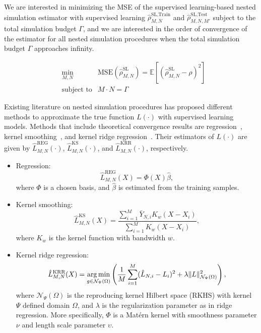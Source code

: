 We are interested in minimizing the MSE of the supervised learning-based nested simulation estimator with supervised learning $\hat{\rho}^{\text{SL}, \text{Train}}_{M, N}$ and $\hat{\rho}^{\text{SL}, \text{Test}}_{M, N, M'}$ subject to the total simulation budget $\Gamma$, and we are interested in the order of convergence of the estimator for all nested simulation procedures when the total simulation budget $\Gamma$ approaches infinity.

\begin{align}
    & \min_{M, N}  & \text{MSE}(\hat{\rho}^{\text{SL}}_{M, N}) = \mathbb{E} \left[ \left( \hat{\rho}^{\text{SL}}_{M, N} - \rho \right)^2 \right] \nonumber \\
    & \text{subject to} & M \cdot N = \Gamma 
\end{align}

Existing literature on nested simulation procedures has proposed different methods to approximate the true function $L(\cdot)$ with supervised learning models. 
Methods that include theoretical convergence results are regression~\citep{broadie2015risk}, kernel smoothing~\citep{hong2017kernel}, and kernel ridge regression~\citep{wang2022smooth}.
Their estimators of $L(\cdot)$ are given by $\hat{L}^{\text{REG}}_{M, N}(\cdot)$, $\hat{L}^{\text{KS}}_{M, N}(\cdot)$, and $\hat{L}^{\text{KRR}}_{M, N}(\cdot)$, respectively.

\begin{itemize}
    \item   Regression:
            $$\hat{L}^{\text{REG}}_{M, N}(X) = \Phi(X) \hat{\beta},$$
            where $\Phi$ is a chosen basis, and $\hat{\beta}$ is estimated from the training samples.
    \item   Kernel smoothing:
            $$\hat{L}^{\text{KS}}_{M, N}(X) = \frac{\sum_{i=1}^M \bar{Y}_{N, i} K_w(X - X_i)}{\sum_{i=1}^M K_w(X - X_i)}, $$
            where $K_w$ is the kernel function with bandwidth $w$.
    \item   Kernel ridge regression:
            $$\hat{L}^{\text{KRR}}_{M, N}(X) = \operatorname*{arg\,min}_{g \in \mathcal{N}_{\Psi}(\Omega)} \left( \frac{1}{M} \sum_{i=1}^M (\hat{L}_{N, i} - L_i)^2 + \lambda \|L\|_{\mathcal{N}_{\Psi}(\Omega)}^2\right),$$
            where $\mathcal{N}_{\Psi}(\Omega)$ is the reproducing kernel Hilbert space (RKHS) with kernel $\Psi$ defined domain $\Omega$, and $\lambda$ is the regularization parameter as in ridge regression. 
            More specifically, $\Phi$ is a Mat\'ern kernel with smoothness parameter $\nu$ and length scale parameter $\upsilon$.
\end{itemize}


